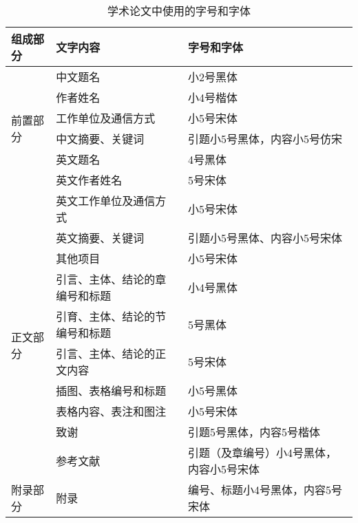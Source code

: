 \begin{table}[!htbp]
\centering
\caption{学术论文中使用的字号和字体}
        \begin{tabularx}{\linewidth}{|l|l|X|}
     \hline
    {组成部分} & {文字内容} & {字号和字体} \\
    \hline
    \multirow{6}[18]{*}{{前置部分}} & {中文题名} & {小2号黑体} \\
\cline{2-3}     & {作者姓名} & {小4号楷体} \\
\cline{2-3}     & {工作单位及通信方式} & {小5号宋体} \\
\cline{2-3}     & {中文摘要、关键词} & {引题小5号黑体，内容小5号仿宋} \\
\cline{2-3}     & {英文题名} & {4号黑体} \\
\cline{2-3}     & {英文作者姓名} & {5号宋体} \\
\cline{2-3}     & {英文工作单位及通信方式} & {小5号宋体} \\
\cline{2-3}     & {英文摘要、关键词} & {引题小5号黑体、内容小5号宋体} \\
\cline{2-3}     & {其他项目} & {小5号宋体} \\
    \hline
    \multirow{5}[14]{*}{{正文部分}} & {引言、主体、结论的章编号和标题} & {小4号黑体} \\
\cline{2-3}     & {引育、主体、结论的节编号和标题} & {5号黑体} \\
\cline{2-3}     &  {引言、主体、结论的正文内容} & {5号宋体} \\
\cline{2-3}     &  {插图、表格编号和标题} & {小5号黑体} \\
\cline{2-3}     &  {表格内容、表注和图注} & {小5号宋体} \\
\cline{2-3}     & {致谢} & {引题5号黑体，内容5号楷体} \\
\cline{2-3}     & {参考文献} & {引题（及章编号）小4号黑体，内容小5号宋体} \\
    \hline
    {附录部分} & {附录} & {编号、标题小4号黑体，内容5号宋体} \\
    \hline
    \end{tabularx}%
\end{table}%